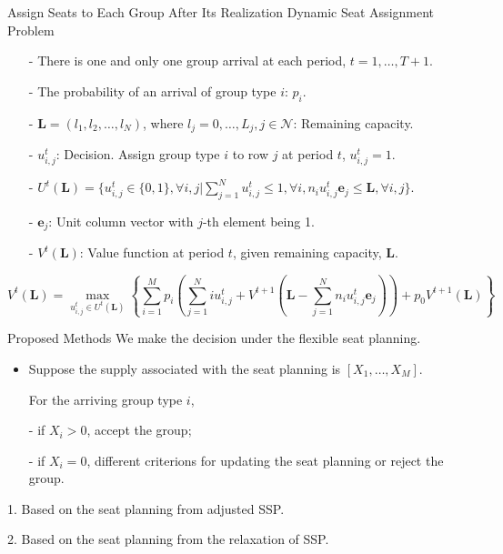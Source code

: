   \begin{frame}{Assign Seats to Each Group After Its Realization}
    \centering
    Dynamic Seat Assignment Problem
    \small
    \begin{itemize}
    \item[-] There is one and only one group arrival at each period, $t = 1, \ldots, T+1$. 
    \item[-] The probability of an arrival of group type $i$: $p_i$.  
    \item[-] $\mathbf{L} = (l_1, l_2, \ldots, l_{N})$, where $l_j =0,\ldots, L_j, j\in \mathcal{N}$: Remaining capacity.
    \item[-] $u_{i,j}^{t}$: Decision. Assign group type $i$ to row $j$ at period $t$, $u_{i,j}^t =1$.
    \item[-] $U^{t}(\mathbf{L}) = \{u_{i,j}^{t} \in\{0,1\}, \forall i,j| \sum_{j=1}^{N} u_{i,j}^{t} \leq 1, \forall i, n_{i}u_{i,j}^{t}\mathbf{e}_j \leq \mathbf{L}, \forall i,j \}$.
    \item[-] $\mathbf{e}_j$: Unit column vector with $j$-th element being 1.
    \item[-] $V^{t}(\mathbf{L})$: Value function at period $t$, given remaining capacity, $\mathbf{L}$.
    \end{itemize}

    $$V^{t}(\mathbf{L}) = \max_{u_{i,j}^{t} \in U^{t}(\mathbf{L})}\left\{ \sum_{i=1}^{M} p_i ( \sum_{j=1}^{N} i u_{i,j}^{t} + V^{t+1}(\mathbf{L}- \sum_{j=1}^{N} n_i u_{i,j}^{t}\mathbf{e}_j)) + p_0 V^{t+1}(\mathbf{L})\right\}$$
    \small
\end{frame}

  \begin{frame}{Proposed Methods}
    We make the decision under the flexible seat planning.

    \begin{itemize}
      \item Suppose the supply associated with the seat planning is $[X_{1}, \ldots, X_M]$.
      
      \vspace{0.5cm}

      For the arriving group type $i$,

      \item[-] if $X_i > 0$, accept the group; 
      
      \item[-] if $X_i = 0$, different criterions for updating the seat planning or reject the group.
    \end{itemize}
    
    \vspace{0.5cm}

    1. Based on the seat planning from adjusted SSP.

    2. Based on the seat planning from the relaxation of SSP.
  \end{frame}

